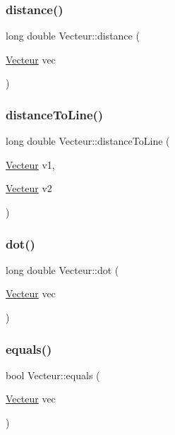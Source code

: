 \mbox{\label{classVecteur_a28b291c3ecbc611175321e67655cd5b5}} 
\subsubsection{\texorpdfstring{distance()}{distance()}}
{\footnotesize\ttfamily long double Vecteur\+::distance (\begin{DoxyParamCaption}\item[{\mbox{\hyperlink{classVecteur}{Vecteur}}}]{vec }\end{DoxyParamCaption})}

\mbox{\label{classVecteur_ac57b63f7ff320f2305bcd2ffb4c2ca9d}} 
\subsubsection{\texorpdfstring{distance\+To\+Line()}{distanceToLine()}}
{\footnotesize\ttfamily long double Vecteur\+::distance\+To\+Line (\begin{DoxyParamCaption}\item[{\mbox{\hyperlink{classVecteur}{Vecteur}}}]{v1,  }\item[{\mbox{\hyperlink{classVecteur}{Vecteur}}}]{v2 }\end{DoxyParamCaption})}

\mbox{\label{classVecteur_a4ece0903d42ac6d70fb223e660270d9e}} 
\subsubsection{\texorpdfstring{dot()}{dot()}}
{\footnotesize\ttfamily long double Vecteur\+::dot (\begin{DoxyParamCaption}\item[{\mbox{\hyperlink{classVecteur}{Vecteur}}}]{vec }\end{DoxyParamCaption})}

\mbox{\label{classVecteur_a64470db63328bb99ffa9f0cd3ff8857e}} 
\subsubsection{\texorpdfstring{equals()}{equals()}}
{\footnotesize\ttfamily bool Vecteur\+::equals (\begin{DoxyParamCaption}\item[{\mbox{\hyperlink{classVecteur}{Vecteur}}}]{vec }\end{DoxyParamCaption})}

